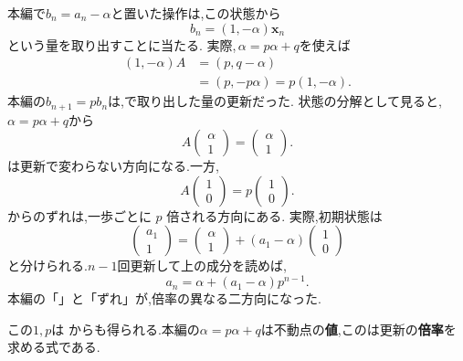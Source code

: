 本編で$b_n=a_n-\alpha$と置いた操作は,この状態から
\[
  b_n=(1,-\alpha)\boldsymbol{x}_n
\]
という量を取り出すことに当たる.
実際,\,$\alpha=p\alpha+q$を使えば
\[
  \begin{aligned}
    (1,-\alpha)A
      &=(p,q-\alpha)\\
      &=(p,-p\alpha)=p(1,-\alpha).
  \end{aligned}
\]
本編の$b_{n+1}=pb_n$は,で取り出した量の更新だった.
状態の分解として見ると,$\alpha=p\alpha+q$から
\[
  A\begin{pmatrix}\alpha\\1\end{pmatrix}
  =
  \begin{pmatrix}\alpha\\1\end{pmatrix}.
\]
は更新で変わらない方向になる.一方,
\[
  A\begin{pmatrix}1\\0\end{pmatrix}
  =
  p\begin{pmatrix}1\\0\end{pmatrix}.
\]
からのずれは,一歩ごとに $p$ 倍される方向にある.
実際,初期状態は
\[
  \begin{pmatrix}a_1\\1\end{pmatrix}
  =
  \begin{pmatrix}\alpha\\1\end{pmatrix}
  +(a_1-\alpha)\begin{pmatrix}1\\0\end{pmatrix}
\]
と分けられる.$n-1$回更新して上の成分を読めば,
\[
  a_n=\alpha+(a_1-\alpha)p^{n-1}.
\]
本編の「」と「ずれ」が,倍率の異なる二方向になった.

この$1,p$は
\BookMathLayout{\[
  \det(\lambda I-A)
  =
  \det\begin{pmatrix}\lambda-p&-q\\0&\lambda-1\end{pmatrix}
  =(\lambda-p)(\lambda-1)=0
\]}{
\[
\begin{aligned}
\det(\lambda I-A)&=\det\begin{pmatrix}\lambda-p&-q\\0&\lambda-1\end{pmatrix}\\
&=(\lambda-p)(\lambda-1)=0
\end{aligned}
\]
}
からも得られる.本編の$\alpha=p\alpha+q$は不動点の\textbf{値},このは更新の\textbf{倍率}を求める式である.

